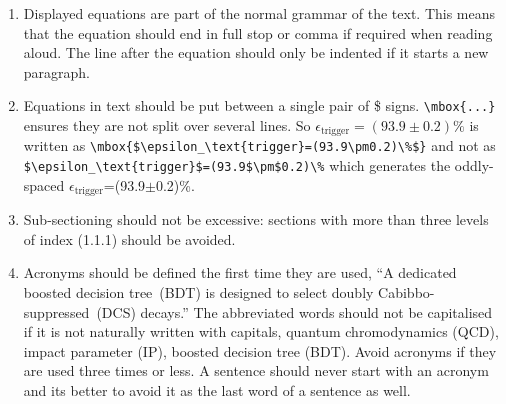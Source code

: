 \begin{enumerate}
\item Displayed equations are part of the normal grammar of the
  text. This means that the equation should end in full stop or comma if
  required when reading aloud. The line after the equation should only
  be indented if it starts a new paragraph.

\item Equations in text should be put between a single pair of \$ signs.
  \verb!\mbox{...}! ensures they are not split over several lines.
  So \mbox{$\epsilon_\text{trigger}=(93.9\pm0.2)\%$} is written as
  \verb!\mbox{$\epsilon_\text{trigger}=(93.9\pm0.2)\%$}! and not as
  \verb!$\epsilon_\text{trigger}$=(93.9$\pm$0.2)\%! which generates the oddly-spaced $\epsilon_\text{trigger}$=(93.9$\pm$0.2)\%.

\item Sub-sectioning should not be excessive: sections with more than three
levels of index (1.1.1) should be avoided.


\item Acronyms should be defined the first time they are used,
  \eg ``A dedicated boosted decision tree~(BDT) is designed to select doubly Cabibbo-suppressed~(DCS) decays.''
  The abbreviated words should not be capitalised if it is not naturally
  written with capitals, \eg quantum chromodynamics (QCD),
  impact parameter (IP), boosted decision tree (BDT).
  Avoid acronyms if they are used three times or less.
  A sentence should never start with an acronym and its better to
  avoid it as the last word of a sentence as well.

\end{enumerate}

